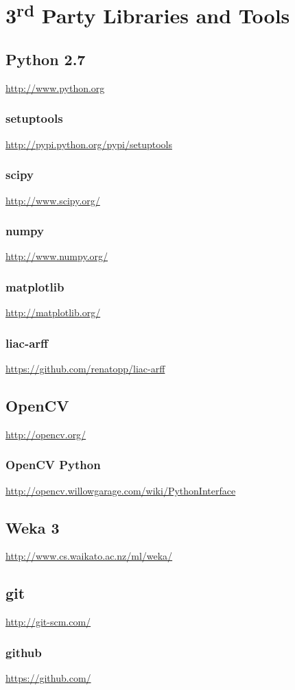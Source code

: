 \chapter{3\textsuperscript{rd} Party Libraries and Tools}


\section{Python 2.7}
\url{http://www.python.org}

\subsection{setuptools}
\url{http://pypi.python.org/pypi/setuptools}

\subsection{scipy}
\url{http://www.scipy.org/}\cite{EricJonesandTravisOliphantandPearuPetersonandothers2001SciPy}

\subsection{numpy}
\url{http://www.numpy.org/}\cite{EricJonesandTravisOliphantandPearuPetersonandothers2001SciPy}

\subsection{matplotlib}
\url{http://matplotlib.org/}

\subsection{liac-arff}
\url{https://github.com/renatopp/liac-arff}

\section{OpenCV}
\url{http://opencv.org/}\cite{opencv_library}

\subsection{OpenCV Python}
\url{http://opencv.willowgarage.com/wiki/PythonInterface}\cite{opencv_library}

\section{Weka 3}
\url{http://www.cs.waikato.ac.nz/ml/weka/}\cite{Hall2009WEKA}

\section{git}
\url{http://git-scm.com/}

\subsection{github}
\url{https://github.com/}


